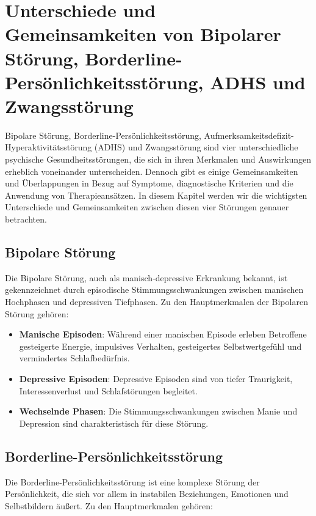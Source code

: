 \section{Unterschiede und Gemeinsamkeiten von Bipolarer Störung, Borderline-Persönlichkeitsstörung, ADHS und Zwangsstörung}

Bipolare Störung, Borderline-Persönlichkeitsstörung, Aufmerksamkeitsdefizit- Hyperaktivitätsstörung (ADHS) und Zwangsstörung sind vier unterschiedliche psychische Gesundheitsstörungen, die sich in ihren Merkmalen und Auswirkungen erheblich voneinander unterscheiden. Dennoch gibt es einige Gemeinsamkeiten und Überlappungen in Bezug auf Symptome, diagnostische Kriterien und die Anwendung von Therapieansätzen. In diesem Kapitel werden wir die wichtigsten Unterschiede und Gemeinsamkeiten zwischen diesen vier Störungen genauer betrachten.

\subsection{Bipolare Störung}

Die Bipolare Störung, auch als manisch-depressive Erkrankung bekannt, ist gekennzeichnet durch episodische Stimmungsschwankungen zwischen manischen Hochphasen und depressiven Tiefphasen. Zu den Hauptmerkmalen der Bipolaren Störung gehören:

\begin{itemize}
\item \textbf{Manische Episoden}: Während einer manischen Episode erleben Betroffene gesteigerte Energie, impulsives Verhalten, gesteigertes Selbstwertgefühl und vermindertes Schlafbedürfnis.

\item \textbf{Depressive Episoden}: Depressive Episoden sind von tiefer Traurigkeit, Interessenverlust und Schlafstörungen begleitet.

\item \textbf{Wechselnde Phasen}: Die Stimmungsschwankungen zwischen Manie und Depression sind charakteristisch für diese Störung.
\end{itemize}

\subsection{Borderline-Persönlichkeitsstörung}

Die Borderline-Persönlichkeitsstörung ist eine komplexe Störung der Persönlichkeit, die sich vor allem in instabilen Beziehungen, Emotionen und Selbstbildern äußert. Zu den Hauptmerkmalen gehören:


